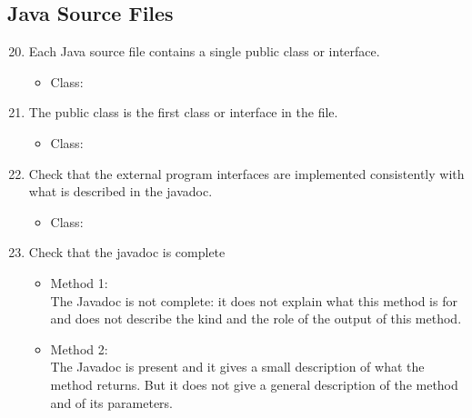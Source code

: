 \subsection{Java Source Files}
\begin{enumerate}
\setcounter{enumi}{19}
	\item Each Java source file contains a single public class or interface.
	\begin{itemize}
	 	\item Class: \cmark
	\end{itemize}
	\item The public class is the first class or interface in the file.
	\begin{itemize}
	 	\item Class: \cmark 
	\end{itemize}
	\item Check that the external program interfaces are implemented consistently with what is described in the javadoc.
	\begin{itemize}
	 	\item Class: \cmark
	\end{itemize}
	\item Check that the javadoc is complete
	\begin{itemize}
	 	\item Method 1: \xmark\\
	 	The Javadoc is not complete: it does not explain what this method is for and does not describe the kind and the role of the output of this method.
 		\item Method 2: \xmark\\
 		The Javadoc is present and it gives a small description of what the method returns. But it does not give a general description of the method and of its parameters.
	\end{itemize}
\end{enumerate}